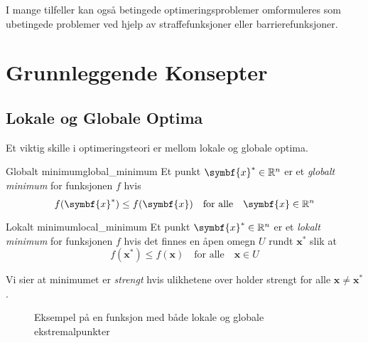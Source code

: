 I mange tilfeller kan også betingede optimeringsproblemer omformuleres som ubetingede problemer ved hjelp av straffefunksjoner eller barrierefunksjoner.

\section{Grunnleggende Konsepter}

\subsection{Lokale og Globale Optima}

Et viktig skille i optimeringsteori er mellom lokale og globale optima.

\begin{definition}{Globalt minimum}{global_minimum}
	Et punkt \(\symbf{x}^\ast \in \R^n\) er et \textit{globalt minimum} for funksjonen \(f\) hvis
	\[
		f(\symbf{x}^\ast) \leq f(\symbf{x}) \quad \text{for alle} \quad \symbf{x} \in \R^n
	\]
\end{definition}

\begin{definition}{Lokalt minimum}{local_minimum}
	Et punkt \(\symbf{x}^\ast \in \R^n\) er et \textit{lokalt minimum} for funksjonen \(f\) hvis det finnes en åpen omegn \(U\) rundt \(\symbf{x}^\ast\) slik at
	\[
		f(\symbf{x}^\ast) \leq f(\symbf{x}) \quad \text{for alle} \quad \symbf{x} \in U
	\]
\end{definition}

Vi sier at minimumet er \textit{strengt} hvis ulikhetene over holder strengt for alle $\symbf{x} \neq \symbf{x}^\ast$.

\begin{figure}[h]
	\centering
	\caption{Eksempel på en funksjon med både lokale og globale ekstremalpunkter}
	\label{fig:local_vs_global}
\end{figure}

